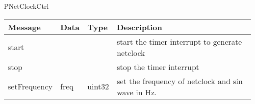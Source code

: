  {PNetClockCtrl}

\begin{tabular}[ht]{|l|l|l|p{8cm}|}
\hline
Message & Data & Type & Description\\
\hline
start &  &  & %
start the timer interrupt to generate netclock
\\
\hline
stop &  &  & %
stop the timer interrupt
\\
\hline
setFrequency &  freq  &  uint32  & %
set the frequency of netclock and sin wave in Hz.
\\
\hline
\end{tabular}
